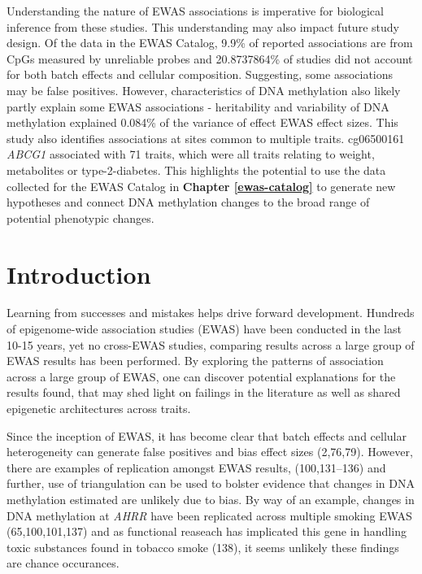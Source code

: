 \documentclass[11pt,oneside]{bristolthesis}
\begin{document}
Understanding the nature of EWAS associations is imperative for biological inference from these studies. This understanding may also impact future study design. Of the data in the EWAS Catalog, 9.9\% of reported associations are from CpGs measured by unreliable probes and 20.8737864\% of studies did not account for both batch effects and cellular composition. Suggesting, some associations may be false positives. However, characteristics of DNA methylation also likely partly explain some EWAS associations - heritability and variability of DNA methylation explained 0.084\% of the variance of effect EWAS effect sizes. This study also identifies associations at sites common to multiple traits. cg06500161 \emph{ABCG1} associated with 71 traits, which were all traits relating to weight, metabolites or type-2-diabetes. This highlights the potential to use the data collected for the EWAS Catalog in \textbf{Chapter \ref{ewas-catalog}} to generate new hypotheses and connect DNA methylation changes to the broad range of potential phenotypic changes.

\hypertarget{introduction-04}{%
\section{Introduction}\label{introduction-04}}

Learning from successes and mistakes helps drive forward development. Hundreds of epigenome-wide association studies (EWAS) have been conducted in the last 10-15 years, yet no cross-EWAS studies, comparing results across a large group of EWAS results has been performed. By exploring the patterns of association across a large group of EWAS, one can discover potential explanations for the results found, that may shed light on failings in the literature as well as shared epigenetic architectures across traits.

Since the inception of EWAS, it has become clear that batch effects and cellular heterogeneity can generate false positives and bias effect sizes (2,76,79). However, there are examples of replication amongst EWAS results, (100,131--136) and further, use of triangulation can be used to bolster evidence that changes in DNA methylation estimated are unlikely due to bias. By way of an example, changes in DNA methylation at \emph{AHRR} have been replicated across multiple smoking EWAS (65,100,101,137) and as functional reaseach has implicated this gene in handling toxic substances found in tobacco smoke (138), it seems unlikely these findings are chance occurances.
\end{document}
